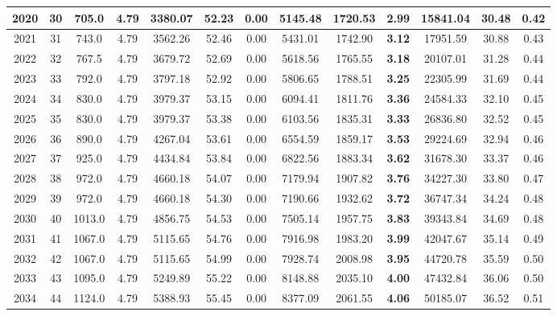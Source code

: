 {\begin{center}
\begin{tabular}[htb]{|c|c||c|c|c|c|c|c||c|c||c|c|c||}
\hline 
 2020 &  30 &  705.0 &  4.79 &  3380.07 &  52.23 &  0.00 &  5145.48 &  1720.53 &  {\bf 2.99} &  15841.04 &  30.48 &  0.42 \\ 
\hline 
 2021 &  31 &  743.0 &  4.79 &  3562.26 &  52.46 &  0.00 &  5431.01 &  1742.90 &  {\bf 3.12} &  17951.59 &  30.88 &  0.43 \\ 
\hline 
 2022 &  32 &  767.5 &  4.79 &  3679.72 &  52.69 &  0.00 &  5618.56 &  1765.55 &  {\bf 3.18} &  20107.01 &  31.28 &  0.44 \\ 
\hline 
 2023 &  33 &  792.0 &  4.79 &  3797.18 &  52.92 &  0.00 &  5806.65 &  1788.51 &  {\bf 3.25} &  22305.99 &  31.69 &  0.44 \\ 
\hline 
 2024 &  34 &  830.0 &  4.79 &  3979.37 &  53.15 &  0.00 &  6094.41 &  1811.76 &  {\bf 3.36} &  24584.33 &  32.10 &  0.45 \\ 
\hline 
 2025 &  35 &  830.0 &  4.79 &  3979.37 &  53.38 &  0.00 &  6103.56 &  1835.31 &  {\bf 3.33} &  26836.80 &  32.52 &  0.45 \\ 
\hline 
 2026 &  36 &  890.0 &  4.79 &  4267.04 &  53.61 &  0.00 &  6554.59 &  1859.17 &  {\bf 3.53} &  29224.69 &  32.94 &  0.46 \\ 
\hline 
 2027 &  37 &  925.0 &  4.79 &  4434.84 &  53.84 &  0.00 &  6822.56 &  1883.34 &  {\bf 3.62} &  31678.30 &  33.37 &  0.46 \\ 
\hline 
 2028 &  38 &  972.0 &  4.79 &  4660.18 &  54.07 &  0.00 &  7179.94 &  1907.82 &  {\bf 3.76} &  34227.30 &  33.80 &  0.47 \\ 
\hline 
 2029 &  39 &  972.0 &  4.79 &  4660.18 &  54.30 &  0.00 &  7190.66 &  1932.62 &  {\bf 3.72} &  36747.34 &  34.24 &  0.48 \\ 
\hline 
 2030 &  40 &  1013.0 &  4.79 &  4856.75 &  54.53 &  0.00 &  7505.14 &  1957.75 &  {\bf 3.83} &  39343.84 &  34.69 &  0.48 \\ 
\hline 
 2031 &  41 &  1067.0 &  4.79 &  5115.65 &  54.76 &  0.00 &  7916.98 &  1983.20 &  {\bf 3.99} &  42047.67 &  35.14 &  0.49 \\ 
\hline 
 2032 &  42 &  1067.0 &  4.79 &  5115.65 &  54.99 &  0.00 &  7928.74 &  2008.98 &  {\bf 3.95} &  44720.78 &  35.59 &  0.50 \\ 
\hline 
 2033 &  43 &  1095.0 &  4.79 &  5249.89 &  55.22 &  0.00 &  8148.88 &  2035.10 &  {\bf 4.00} &  47432.84 &  36.06 &  0.50 \\ 
\hline 
 2034 &  44 &  1124.0 &  4.79 &  5388.93 &  55.45 &  0.00 &  8377.09 &  2061.55 &  {\bf 4.06} &  50185.07 &  36.52 &  0.51 \\ 

\end{tabular}
\end{center}}
